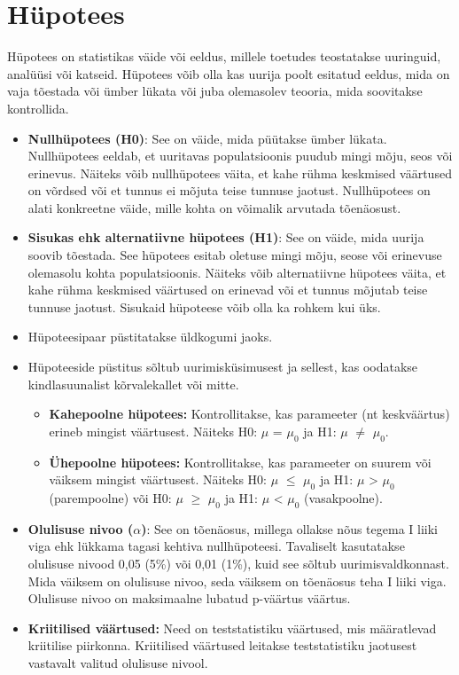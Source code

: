\documentclass[
]{book}
\providecommand{\tightlist}{%
  \setlength{\itemsep}{0pt}\setlength{\parskip}{0pt}}
\begin{document}
\section{Hüpotees}\label{huxfcpotees}

Hüpotees on statistikas väide või eeldus, millele toetudes teostatakse uuringuid, analüüsi või katseid. Hüpotees võib olla kas uurija poolt esitatud eeldus, mida on vaja tõestada või ümber lükata või juba olemasolev teooria, mida soovitakse kontrollida.

\begin{itemize}
\item
  \textbf{Nullhüpotees (H0)}: See on väide, mida püütakse ümber lükata. Nullhüpotees eeldab, et uuritavas populatsioonis puudub mingi mõju, seos või erinevus. Näiteks võib nullhüpotees väita, et kahe rühma keskmised väärtused on võrdsed või et tunnus ei mõjuta teise tunnuse jaotust. Nullhüpotees on alati konkreetne väide, mille kohta on võimalik arvutada tõenäosust.
\item
  \textbf{Sisukas ehk alternatiivne hüpotees (H1)}: See on väide, mida uurija soovib tõestada. See hüpotees esitab oletuse mingi mõju, seose või erinevuse olemasolu kohta populatsioonis. Näiteks võib alternatiivne hüpotees väita, et kahe rühma keskmised väärtused on erinevad või et tunnus mõjutab teise tunnuse jaotust. Sisukaid hüpoteese võib olla ka rohkem kui üks.
\item
  Hüpoteesipaar püstitatakse üldkogumi jaoks.
\item
  Hüpoteeside püstitus sõltub uurimisküsimusest ja sellest, kas oodatakse kindlasuunalist kõrvalekallet või mitte.

  \begin{itemize}
  \tightlist
  \item
    \textbf{Kahepoolne hüpotees:} Kontrollitakse, kas parameeter (nt keskväärtus) erineb mingist väärtusest. Näiteks H0: \(\mu\) = \(\mu_0\) ja H1: \(\mu\) \(\neq\) \(\mu_0\).
  \item
    \textbf{Ühepoolne hüpotees:} Kontrollitakse, kas parameeter on suurem või väiksem mingist väärtusest. Näiteks H0: \(\mu\) \(\le\) \(\mu_0\) ja H1: \(\mu\) \textgreater{} \(\mu_0\) (parempoolne) või H0: \(\mu\) \(\ge\) \(\mu_0\) ja H1: \(\mu\) \textless{} \(\mu_0\) (vasakpoolne).
  \end{itemize}
\item
  \textbf{Olulisuse nivoo (\(\alpha\))}: See on tõenäosus, millega ollakse nõus tegema I liiki viga ehk lükkama tagasi kehtiva nullhüpoteesi. Tavaliselt kasutatakse olulisuse nivood 0,05 (5\%) või 0,01 (1\%), kuid see sõltub uurimisvaldkonnast. Mida väiksem on olulisuse nivoo, seda väiksem on tõenäosus teha I liiki viga. Olulisuse nivoo on maksimaalne lubatud p-väärtus väärtus.
\item
  \textbf{Kriitilised väärtused:} Need on teststatistiku väärtused, mis määratlevad kriitilise piirkonna. Kriitilised väärtused leitakse teststatistiku jaotusest vastavalt valitud olulisuse nivool.


\end{itemize}
\end{document}
